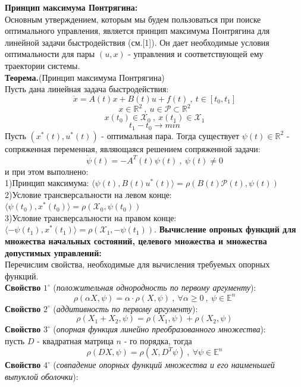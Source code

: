 \documentclass[10pt]{article}
\begin{document}
\textbf{Принцип максимума Понтрягина:}\medskip \\
Основным утверждением, которым мы будем пользоваться при поиске оптимального управления, является принцип максимума Понтрягина для линейной задачи быстродействия (см.[1]). Он дает необходимые условия оптимальности для пары \( (u, x)\) - управления и соответствующей ему траектории системы.\bigskip \\
\textbf{Теорема.}(Принцип максимума Понтрягина)\smallskip\\
Пусть дана линейная задача быстродействия:
\[ \dot{x} = A(t)x + B(t)u + f(t) \ , \ t \in [t_0, t_1]\]
\[x \in \mathbb{R}^2 \ , \ u \in \mathcal{P} \subset \mathbb{R}^2 \]
\[ x(t_0) \in \mathcal{X}_0 \ , \ x(t_1) \in \mathcal{X}_1\]
\[t_1 - t_0 \to min\]
Пусть \( (x^*(t), u^*(t)) \) - оптимальная пара. Тогда существует \( \psi(t) \in \mathbb{R}^2\) - сопряженная переменная, являющаяся решением сопряженной задачи:
\[ \dot{\psi}(t) = -A^T(t) \psi(t) \ , \ \psi(t) \neq 0\]
и при этом выполнено:\medskip\\
1)Принцип максимума:
\( \langle \psi(t), B(t)u^*(t) \rangle = \rho(B(t) \mathcal{P}(t) , \psi(t))\)\medskip\\
2)Условие трансверсальности на левом конце:
\( \langle \psi(t_0), x^*(t_0) \rangle = \rho(\mathcal{X}_0 , \psi(t_0))\)\medskip\\
3)Условие трансверсальности на правом конце:
\(\langle -\psi(t_1), x^*(t_1) \rangle = \rho(\mathcal{X}_1 , -\psi(t_1)).\)
\newpage
\noindent\textbf{Вычисление опроных функций для множества начальных состояний, целевого множества и множества допустимых управлений:}\bigskip \\
Перечислим свойства, необходимые для вычисления требуемых опорных функций.\medskip\\
\textbf{Свойство} \(1^{\circ}\) (\textit{положительная однородность по первому аргументу}):
\[ \rho( \alpha X, \psi) = \alpha \cdot \rho(X, \psi) \ , \ \forall \alpha \geq 0 \ , \ \psi \in \mathbb{E}^n\]
\textbf{Свойство} \(2^{\circ}\) (\textit{аддитивность по первому аргументу}):
\[ \rho(X_1 + X_2, \psi) = \rho(X_1, \psi) + \rho(X_2, \psi)\]
\textbf{Свойство} \(3^{\circ}\) (\textit{опорная функция линейно преобразованного множества}):\\
пусть \(D\) - квадратная матрица \(n\) - го порядка, тогда
\[ \rho(DX, \psi) = \rho(X, D^T\psi) \ , \ \forall \psi \in \mathbb{E}^n\]
\textbf{Свойство} \(4^{\circ}\) (\textit{совпадение опорных функций множества и его наименьшей выпуклой оболочки}):
\end{document}
